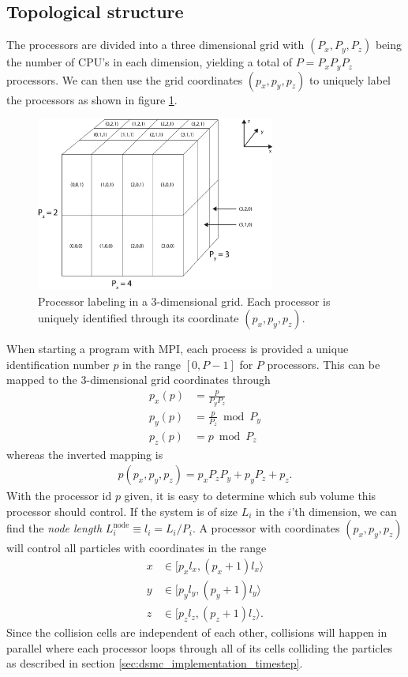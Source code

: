 \subsection{Topological structure}
The processors are divided into a three dimensional grid with $(P_x, P_y, P_z)$ being the number of CPU's in each dimension, yielding a total of $P = P_xP_yP_z$ processors. We can then use the grid coordinates $(p_x, p_y, p_z)$ to uniquely label the processors as shown in figure \ref{fig:dsmc_parallelization_2}.
\begin{figure}[htpb]
\begin{center}
\includegraphics[width=0.7\textwidth, trim=0cm 0cm 0cm 0cm, clip]{DSMC/figures/parallelization_node_configuration.eps}
\end{center}
\caption{Processor labeling in a 3-dimensional grid. Each processor is uniquely identified through its coordinate $(p_x, p_y, p_z)$.}
\label{fig:dsmc_parallelization_2}
\end{figure}
When starting a program with MPI, each process is provided a unique identification number $p$ in the range $[0, P-1]$ for $P$ processors. This can be mapped to the 3-dimensional grid coordinates through
\begin{align}
	\nonumber
	p_x(p) &= \frac{p }{ P_yP_z}\\
	\nonumber
	p_y(p) &= \frac{p }{ P_z} \bmod P_y\\
	p_z(p) &= p \bmod P_z
\end{align}
whereas the inverted mapping is 
\begin{align}
	p(p_x, p_y, p_z) = p_xP_zP_y + p_yP_z + p_z.
\end{align}
With the processor id $p$ given, it is easy to determine which sub volume this processor should control. If the system is of size $L_i$ in the $i$'th dimension, we can find the \textit{node length} $L_i^{\text{node}} \equiv l_i = L_i/P_i$. A processor with coordinates $(p_x, p_y, p_z)$ will control all particles with coordinates in the range
\begin{align}
	\nonumber
	x&\in[p_xl_x, (p_x+1)l_x\rangle\\
	\nonumber
	y&\in[p_yl_y, (p_y+1)l_y\rangle\\
	z&\in[p_zl_z, (p_z+1)l_z\rangle.
\end{align}
Since the collision cells are independent of each other, collisions will happen in parallel where each processor loops through all of its cells colliding the particles as described in section \ref{sec:dsmc_implementation_timestep}. 
